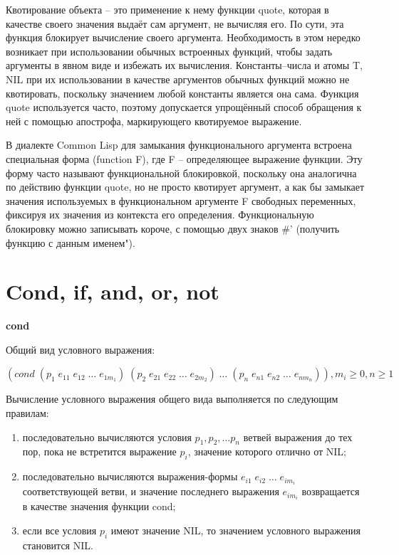 \documentclass{article}
\begin{document}
Квотирование объекта -- это применение к нему функции quote, которая в качестве своего значения выдаёт сам аргумент, не вычисляя его. По сути, эта функция блокирует вычисление своего аргумента. Необходимость в этом нередко возникает при использовании обычных встроенных функций, чтобы задать аргументы в явном виде и избежать их вычисления. Константы–числа и атомы T, NIL при их  использовании в качестве аргументов обычных функций можно не  квотировать, поскольку значением любой константы является она сама. Функция quote используется часто, поэтому допускается упрощённый способ обращения к ней с помощью апострофа, маркирующего квотируемое выражение.


В диалекте Common Lisp для замыкания функционального аргумента встроена специальная форма (function F), где F – определяющее  выражение функции. Эту форму часто называют функциональной  блокировкой, поскольку она аналогична по действию функции quote, но  не просто квотирует аргумент, а как бы замыкает значения используемых  в функциональном аргументе F свободных переменных, фиксируя их значения из контекста его определения. Функциональную блокировку  можно записывать короче, с помощью двух знаков \#' (получить функцию с данным именем").


















\section*{Cond, if, and, or, not}

\textbf{cond}

Общий вид условного выражения:

$(cond \; (p_1  \; e_{11}  \;  e_{12}  \;  …  \;  e_{1m_1})  \;  (p_2  \;  e_{21} \;  e_{22}  \;  …  \;  e_{2m_2})  \;  …  \;  (p_n  \; e_{n1} \;  e_{n2} \;  …  \; e_{nm_n})), m_i \geqslant 0 , n \geqslant 1$

Вычисление условного выражения общего вида выполняется по  следующим правилам:

\begin{enumerate}
	\item последовательно вычисляются условия $p_1, p_2, … p_n$ ветвей выражения до тех пор, пока не встретится выражение $p_i$, значение   которого отлично от NIL;
	\item последовательно вычисляются выражения-формы $e_{i1} \;  e_{i2} \;  … \;  e_{im_i}$ соответствующей ветви, и значение последнего выражения $e_{im_i}$ возвращается в качестве значения функции cond;
	\item если все условия $p_i$ имеют значение NIL, то значением условного выражения становится NIL.
\end{enumerate}
\end{document}
